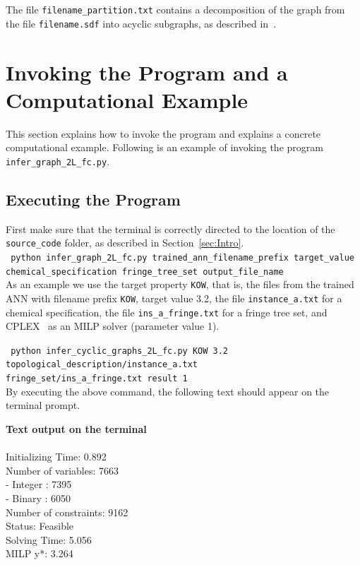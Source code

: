 \documentclass[11pt, titlepage, dvipdfmx, twoside]{article}
\begin{document}
\noindent
The file {\tt filename\_partition.txt} contains a 
decomposition of the graph from the 
file {\tt filename.sdf} into acyclic subgraphs,
as described in~\cite{cyclic_BH_arxiv}.



\section{Invoking the Program and a Computational Example}
\label{sec:Exp}

This section explains how to invoke the program
and explains a concrete computational example.
Following is an example of invoking the
program {\tt infer\_graph\_2L\_fc.py}.


\subsection{Executing the Program}
\label{sec:Exp_1}

First make sure that the terminal is 
correctly directed to the location
of the {\tt source\_code} folder, as described in Section~\ref{sec:Intro}. \\

\noindent
{\tt 
 python  infer\_graph\_2L\_fc.py 
trained\_ann\_filename\_prefix
target\_value \\
 \phantom{python } 
 chemical\_specification
 fringe\_tree\_set
output\_file\_name
 }\\


As an example we use the target property {\tt KOW}, 
that is, the files from the trained ANN with filename prefix {\tt KOW},
target value 3.2,
the file {\tt instance\_a.txt} for a chemical specification,
the file {\tt ins\_a\_fringe.txt} for a fringe tree set,
and CPLEX~\cite{cplex} as an MILP solver (parameter value 1).

{\tt 
 python infer\_cyclic\_graphs\_2L\_fc.py 
KOW
3.2 \\
 \phantom{python } 
topological\_description/instance\_a.txt \\
 \phantom{python } 
fringe\_set/ins\_a\_fringe.txt
result
1
 }\\


By executing the above command, the following text should appear on the terminal prompt.

\bigskip

\begin{oframed}
{\bf Text output on the terminal}\\\\
 Initializing Time: 0.892        \\       
Number of variables: 7663        \\ 
 - Integer : 7395                \\ 
 - Binary  : 6050                \\ 
 Number of constraints: 9162     \\ 
Status: Feasible                 \\ 
Solving Time: 5.056              \\ 
MILP y*: 3.264                   
\end{oframed}
\end{document}
